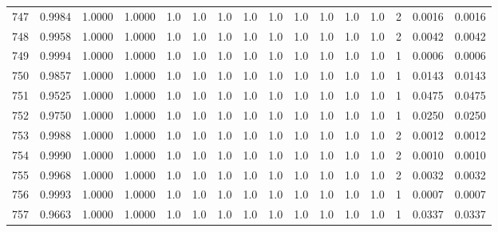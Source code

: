 \begin{tabular}{lrrrrrrrrrrrrrrr}
747 &      0.9984 &  1.0000 &  1.0000 &     1.0 &     1.0 &     1.0 &     1.0 &     1.0 &     1.0 &     1.0 &      1.0 &        1.0 &      2 &                    0.0016 &                     0.0016 \\
748 &      0.9958 &  1.0000 &  1.0000 &     1.0 &     1.0 &     1.0 &     1.0 &     1.0 &     1.0 &     1.0 &      1.0 &        1.0 &      2 &                    0.0042 &                     0.0042 \\
749 &      0.9994 &  1.0000 &  1.0000 &     1.0 &     1.0 &     1.0 &     1.0 &     1.0 &     1.0 &     1.0 &      1.0 &        1.0 &      1 &                    0.0006 &                     0.0006 \\
750 &      0.9857 &  1.0000 &  1.0000 &     1.0 &     1.0 &     1.0 &     1.0 &     1.0 &     1.0 &     1.0 &      1.0 &        1.0 &      1 &                    0.0143 &                     0.0143 \\
751 &      0.9525 &  1.0000 &  1.0000 &     1.0 &     1.0 &     1.0 &     1.0 &     1.0 &     1.0 &     1.0 &      1.0 &        1.0 &      1 &                    0.0475 &                     0.0475 \\
752 &      0.9750 &  1.0000 &  1.0000 &     1.0 &     1.0 &     1.0 &     1.0 &     1.0 &     1.0 &     1.0 &      1.0 &        1.0 &      1 &                    0.0250 &                     0.0250 \\
753 &      0.9988 &  1.0000 &  1.0000 &     1.0 &     1.0 &     1.0 &     1.0 &     1.0 &     1.0 &     1.0 &      1.0 &        1.0 &      2 &                    0.0012 &                     0.0012 \\
754 &      0.9990 &  1.0000 &  1.0000 &     1.0 &     1.0 &     1.0 &     1.0 &     1.0 &     1.0 &     1.0 &      1.0 &        1.0 &      2 &                    0.0010 &                     0.0010 \\
755 &      0.9968 &  1.0000 &  1.0000 &     1.0 &     1.0 &     1.0 &     1.0 &     1.0 &     1.0 &     1.0 &      1.0 &        1.0 &      2 &                    0.0032 &                     0.0032 \\
756 &      0.9993 &  1.0000 &  1.0000 &     1.0 &     1.0 &     1.0 &     1.0 &     1.0 &     1.0 &     1.0 &      1.0 &        1.0 &      1 &                    0.0007 &                     0.0007 \\
757 &      0.9663 &  1.0000 &  1.0000 &     1.0 &     1.0 &     1.0 &     1.0 &     1.0 &     1.0 &     1.0 &      1.0 &        1.0 &      1 &                    0.0337 &                     0.0337 \\

\end{tabular}

